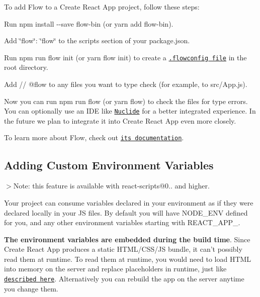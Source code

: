 To add Flow to a Create React App project, follow these steps\+:


\begin{DoxyEnumerate}
\item Run {\ttfamily npm install -\/-\/save flow-\/bin} (or {\ttfamily yarn add flow-\/bin}).
\item Add {\ttfamily \char`\"{}flow\char`\"{}\+: \char`\"{}flow\char`\"{}} to the {\ttfamily scripts} section of your {\ttfamily package.\+json}.
\item Run {\ttfamily npm run flow init} (or {\ttfamily yarn flow init}) to create a \href{https://flowtype.org/docs/advanced-configuration.html}{\tt {\ttfamily .flowconfig} file} in the root directory.
\item Add {\ttfamily // @flow} to any files you want to type check (for example, to {\ttfamily src/\+App.\+js}).
\end{DoxyEnumerate}

Now you can run {\ttfamily npm run flow} (or {\ttfamily yarn flow}) to check the files for type errors. You can optionally use an I\+DE like \href{https://nuclide.io/docs/languages/flow/}{\tt Nuclide} for a better integrated experience. In the future we plan to integrate it into Create React App even more closely.

To learn more about Flow, check out \href{https://flowtype.org/}{\tt its documentation}.

\subsection*{Adding Custom Environment Variables}

$>$Note\+: this feature is available with {\ttfamily react-\/scripts@0..} and higher.

Your project can consume variables declared in your environment as if they were declared locally in your JS files. By default you will have {\ttfamily N\+O\+D\+E\+\_\+\+E\+NV} defined for you, and any other environment variables starting with {\ttfamily R\+E\+A\+C\+T\+\_\+\+A\+P\+P\+\_\+}.

{\bfseries The environment variables are embedded during the build time}. Since Create React App produces a static H\+T\+M\+L/\+C\+S\+S/\+JS bundle, it can’t possibly read them at runtime. To read them at runtime, you would need to load H\+T\+ML into memory on the server and replace placeholders in runtime, just like \href{#injecting-data-from-the-server-into-the-page}{\tt described here}. Alternatively you can rebuild the app on the server anytime you change them.

